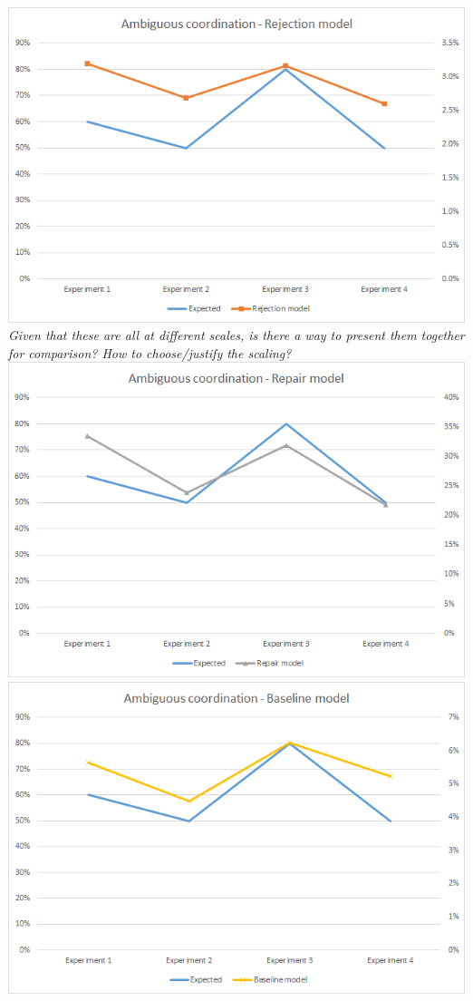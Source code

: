 \documentclass[12pt,a4paper]{article}
\begin{document}
\begin{center}
\includegraphics[width=\textwidth]{ambiguous_coordination_rejection.png}
\textit{Given that these are all at different scales, is there a way to present them together for comparison? How to choose/justify the scaling?}
\includegraphics[width=\textwidth]{ambiguous_coordination_repair.png}
\includegraphics[width=\textwidth]{ambiguous_coordination_baseline.png}

\end{center}
\end{document}
